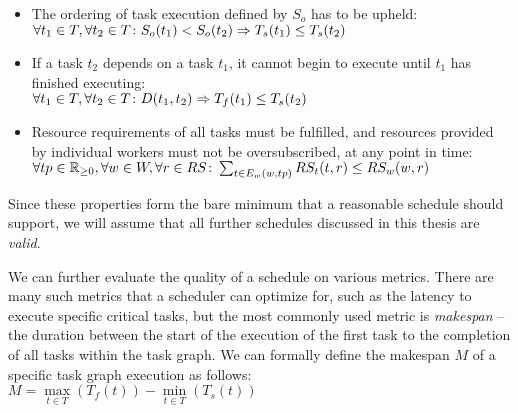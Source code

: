 \begin{itemize}
	\item The ordering of task execution defined by $S_o$ has to be upheld: \\
	      $\forall t_1\in{}T, \forall t_2\in{}T\colon S_o(t_1) < S_o(t_2) \Rightarrow T_s(t_1) \leq T_s(t_2)$
	\item If a task $t_2$ depends on a task $t_1$, it cannot begin to
	      execute until $t_1$ has finished executing: \\ $\forall t_1\in{}T, \forall t_2\in{}T\colon D(t_1, t_2) \Rightarrow T_f(t_1) \leq T_s(t_2)$
	\item Resource requirements of all tasks must be fulfilled, and resources provided by
	individual workers must not be oversubscribed, at any point in time: \\
	      $\forall tp\in\mathbb{R}_{\geq{}0}, \forall w\in{}W, \forall r\in{}RS\colon
		      \sum_{t\in{}E_w(w, tp)} RS_t(t, r) \leq RS_w(w, r)$
\end{itemize}

Since these properties form the bare minimum that a reasonable schedule should support, we will
assume that all further schedules discussed in this thesis are \emph{valid}.

We can further evaluate the quality of a schedule on various metrics. There are many such metrics
that a scheduler can optimize for, such as the latency to execute specific
critical tasks, but the most commonly used metric is \emph{makespan} -- the duration
between the start of the execution of the first task to the completion of all tasks within the task
graph. We can formally define the makespan $M$ of a specific task graph
execution as follows: \\
$M = \max\limits_{t \in T}(T_f(t)) - \min\limits_{t \in T}(T_s(t))$

